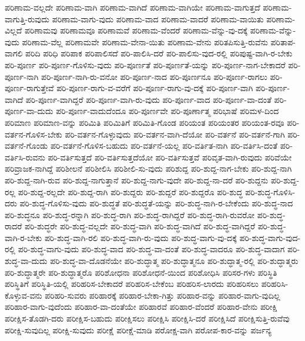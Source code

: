 {ಪರಿಣಾಮ-ವಲ್ಲದೇ
ಪರಿಣಾಮ-ವಾಗಿ
ಪರಿಣಾಮ-ವಾಗಿದೆ
ಪರಿಣಾಮ-ವಾಗಿಯೇ
ಪರಿಣಾಮ-ವಾಗುತ್ತದೆ
ಪರಿಣಾಮ-ವಾಗುತ್ತಿ-ರುವುದು
ಪರಿಣಾಮ-ವಾಗು-ವುದು
ಪರಿಣಾಮ-ವಾದ
ಪರಿಣಾಮ-ವಾದರೆ
ಪರಿಣಾಮ-ವಾಯಿತು
ಪರಿಣಾಮ-ವಿಲ್ಲದೆ
ಪರಿಣಾಮವು
ಪರಿಣಾಮವೂ
ಪರಿಣಾಮವೆ
ಪರಿಣಾಮ-ವೆಂದರೆ
ಪರಿಣಾಮ-ವೆನ್ನು-ವು-ದಕ್ಕೆ
ಪರಿಣಾಮ-ವೆನ್ನು-ವುದು
ಪರಿಣಾಮ-ವೆಲ್ಲ
ಪರಿಣಾಮವೇ
ಪರಿಣಾಮ-ವೇನಾ-ಯಿತು
ಪರಿಣಾಮ-ವೇನು
ಪರಿತಪಿಸುತ್ತಿ-ರುವೆನು
ಪರಿತಾಪ-ವಾಗಲಿ
ಪರಿದಿ
ಪರಿಧಿ
ಪರಿಪಾಕ
ಪರಿಪಾಲಿಸದೆ
ಪರಿ-ಪಾಲಿಸಿ-ದರೆ
ಪರಿ-ಪಾಲಿಸು-ವುದ-ರಲ್ಲಿ
ಪರಿಪುಷ್ಟ-ವಾಗಿ-ರ-ಬೇಕು
ಪರಿ-ಪೂರ್ಣ
ಪರಿ-ಪೂರ್ಣ-ಗೊಳಿಸು-ವುದು
ಪರಿ-ಪೂರ್ಣತೆ
ಪರಿ-ಪೂರ್ಣತೆ-ಯನ್ನು
ಪರಿ-ಪೂರ್ಣ-ನಾಗ-ಬೇಕಾದರೆ
ಪರಿ-ಪೂರ್ಣ-ನಾಗಿ
ಪರಿ-ಪೂರ್ಣ-ನಾಗಿ-ರು-ವನೋ
ಪರಿ-ಪೂರ್ಣ-ನಾದ
ಪರಿ-ಪೂರ್ಣನೂ
ಪರಿ-ಪೂರ್ಣ-ರಾಗಲು
ಪರಿ-ಪೂರ್ಣ-ರಾಗುತ್ತೇವೆ
ಪರಿ-ಪೂರ್ಣ-ರಾಗು-ವ-ವರೆಗೆ
ಪರಿ-ಪೂರ್ಣ-ರಾಗು-ವು-ದಕ್ಕೆ
ಪರಿ-ಪೂರ್ಣ-ವಾಗಿ
ಪರಿ-ಪೂರ್ಣ-ವಾಗಿದೆ
ಪರಿ-ಪೂರ್ಣ-ವಾಗಿದ್ದರೆ
ಪರಿ-ಪೂರ್ಣ-ವಾಗಿ-ರು-ವುದು
ಪರಿ-ಪೂರ್ಣ-ವಾದ
ಪರಿ-ಪೂರ್ಣ-ವಾ-ದಂತೆ
ಪರಿ-ಪೂರ್ಣ-ವಾ-ದುದು
ಪರಿ-ಪೂರ್ಣ-ವಾದುದೆಂದೂ
ಪರಿ-ಪೂರ್ಣವೇ
ಪರಿ-ಪೂರ್ಣಾತ್ಮ
ಪರಿಭಾಷೆ
ಪರಿಮಳ-ದಿಂದ
ಪರಿಮಾಣ
ಪರಿಮಾಣ-ವನ್ನು
ಪರಿಮಿತಿ
ಪರಿಮಿತಿಗೆ
ಪರಿಮಿತಿ-ಗೊಂಡ
ಪರಿಯಂತ
ಪರಿಯಂತರ
ಪರಿಯಂತ-ರವೂ
ಪರಿ-ವರ್ತನ-ಗೊಳಿಸ-ಬೇಕು
ಪರಿ-ವರ್ತನ-ಗೊಳ್ಳುವುದು
ಪರಿ-ವರ್ತನ-ವಾಗಿ-ದೆಯೋ
ಪರಿ-ವರ್ತನೆ
ಪರಿ-ವರ್ತನೆ-ಗಾಗಿ
ಪರಿ-ವರ್ತನೆ-ಗೊಂಡು
ಪರಿ-ವರ್ತನೆ-ಗೊಳಿಸ-ಬಹುದು
ಪರಿ-ವರ್ತನೆ-ಯಲ್ಲ
ಪರಿ-ವರ್ತಿತ-ನಾಗಿ
ಪರಿ-ವರ್ತಿಸಿ-ದಂತೆ
ಪರಿ-ವರ್ತಿಸಿ-ರುವನು
ಪರಿ-ವರ್ತಿಸುತ್ತದೆ
ಪರಿ-ವರ್ತಿಸುತ್ತದೆಯೋ
ಪರಿ-ವರ್ತಿಸುತ್ತವೆ
ಪರಿವೃತ-ವಾಗಿ-ರುವುದು
ಪರಿವೆಯೇ
ಪರಿವ್ರಾಜಕ-ನಾಗಿದ್ದೆ
ಪರಿಶೀಲನೆ
ಪರಿಶೀಲಿಸಿ
ಪರಿಶೀಲಿ-ಸು-ವುದು
ಪರಿಶುದ್ದ
ಪರಿ-ಶುದ್ದ-ನಾಗ-ಬೇಕು
ಪರಿ-ಶುದ್ದ-ನಾಗಿ
ಪರಿ-ಶುದ್ದ-ನಾಗಿ-ರುವ
ಪರಿ-ಶುದ್ದ-ನಾಗುತ್ತಾನೆ
ಪರಿ-ಶುದ್ದ-ನಾಗು-ವುದೇ
ಪರಿ-ಶುದ್ದ-ನಾ-ದರೆ
ಪರಿ-ಶುದ್ದನು
ಪರಿ-ಶುದ್ದ-ರಲ್ಲ
ಪರಿ-ಶುದ್ದ-ರಲ್ಲದೇ
ಪರಿ-ಶುದ್ದ-ರಾಗಿ
ಪರಿ-ಶುದ್ದರು
ಪರಿ-ಶುದ್ದರೆ
ಪರಿ-ಶುದ್ದರೊ
ಪರಿ-ಶುದ್ಧ
ಪರಿ-ಶುದ್ಧ-ಗೊಳಿಸಿ-ದರು
ಪರಿ-ಶುದ್ಧ-ಗೊಳಿಸು-ವುದು
ಪರಿ-ಶುದ್ಧತೆ
ಪರಿ-ಶುದ್ಧತೆ-ಯನ್ನು
ಪರಿ-ಶುದ್ಧ-ನಾಗಿ-ರ-ಬೇಕೆಂದು
ಪರಿ-ಶುದ್ಧ-ನಾದ
ಪರಿ-ಶುದ್ಧನೂ
ಪರಿ-ಶುದ್ಧ-ರನ್ನಾಗಿ
ಪರಿ-ಶುದ್ಧ-ರಾಗಿ
ಪರಿ-ಶುದ್ಧ-ರಾಗಿದ್ದರೆ
ಪರಿ-ಶುದ್ಧ-ರಾಗಿ-ರುವರೋ
ಪರಿ-ಶುದ್ಧ-ರಾದರೆ
ಪರಿ-ಶುದ್ಧರೇ
ಪರಿ-ಶುದ್ಧ-ವಲ್ಲದೇ
ಪರಿ-ಶುದ್ಧ-ವಾಗಿ
ಪರಿ-ಶುದ್ಧ-ವಾಗಿದೆ
ಪರಿ-ಶುದ್ಧ-ವಾಗಿದ್ದರೆ
ಪರಿ-ಶುದ್ಧ-ವಾಗಿ-ರ-ಬೇಕು
ಪರಿ-ಶುದ್ಧ-ವಾಗಿ-ರಲಿ
ಪರಿ-ಶುದ್ಧ-ವಾಗಿ-ರು-ವುದು
ಪರಿ-ಶುದ್ಧ-ವಾಗು-ವು-ದಕ್ಕೆ
ಪರಿ-ಶುದ್ಧ-ವಾಗು-ವುದ-ರಲ್ಲಿ
ಪರಿ-ಶುದ್ಧ-ವಾಗು-ವುದು
ಪರಿ-ಶುದ್ಧ-ವಾದ
ಪರಿ-ಶುದ್ಧ-ವಾ-ದಂತೆ
ಪರಿ-ಶುದ್ಧ-ವಾದರೂ
ಪರಿ-ಶುದ್ಧ-ವಾದಾಗ
ಪರಿ-ಶುದ್ಧ-ವಾ-ದುದು
ಪರಿ-ಶುದ್ಧ-ವಾ-ದೊಡನೆಯೇ
ಪರಿ-ಶುದ್ಧಾತ್ಮ
ಪರಿ-ಶುದ್ಧಾತ್ಮನೂ
ಪರಿ-ಶುದ್ಧಾತ್ಮ-ರಲ್ಲಿ
ಪರಿ-ಶುದ್ಧಾತ್ಮರು
ಪರಿ-ಶುದ್ಧಾತ್ಮರೇ
ಪರಿ-ಶುದ್ಧಾತ್ಮರೊ
ಪರಿಶೋಧನಾ
ಪರಿಶೋಧನೆ-ಯಿಂದ
ಪರಿಶೋಧಿಸಿ
ಪರಿಸರ-ಗಳು
ಪರಿಸ್ಥಿತಿ
ಪರಿಸ್ಥಿತಿಗೆ
ಪರಿಸ್ಥಿತಿ-ಯಲ್ಲಿ
ಪರಿಹರಿಸ-ಬೇಕಾದರೆ
ಪರಿಹರಿಸ-ಬೇಕೆಂಬ
ಪರಿಹರಿಸ-ಲಾರದು
ಪರಿಹರಿಸಲು
ಪರಿಹರಿಸಿ-ಕೊಳ್ಳುವ-ವನು
ಪರಿಹರಿ-ಸುವರು
ಪರಿಹಾರಕ್ಕೆ
ಪರಿಹಾರ-ಬೇಕಾ-ಗಿತ್ತು
ಪರಿಹಾರ-ವನ್ನು
ಪರಿಹಾರ-ವಾಗು-ವುದಿಲ್ಲ
ಪರಿಹಾರ-ವಾಗು-ವುದೆಂದು
ಪರಿಹಾರ-ವಾ-ದಂತೆಯೇ
ಪರಿಹಾರವೆ
ಪರಿಹಾರ-ವೆಂದರೆ
ಪರಿಹಾರ-ವೇನು
ಪರೀಕ್ಷಿ
ಪರೀಕ್ಷಿಸ-ತೊಡಗಿ-ದರು
ಪರೀಕ್ಷಿಸ-ಬಹುದು
ಪರೀಕ್ಷಿಸಲು
ಪರೀಕ್ಷಿಸಿ
ಪರೀಕ್ಷಿಸಿ-ದರೆ
ಪರೀಕ್ಷಿಸಿದೆ
ಪರೀಕ್ಷಿಸುತ್ತಿ-ರುವೆವು
ಪರೀಕ್ಷಿ-ಸುವುದಿಲ್ಲ
ಪರೀಕ್ಷಿ-ಸುವುದು
ಪರೀಕ್ಷೆ
ಪರೀಕ್ಷೆ-ಮಾಡಿ
ಪರೋಕ್ಷ-ವಾಗಿ
ಪರೋಪ-ಕಾರ-ವನ್ನು
ಪರ್ಜನ್ಯ
}
